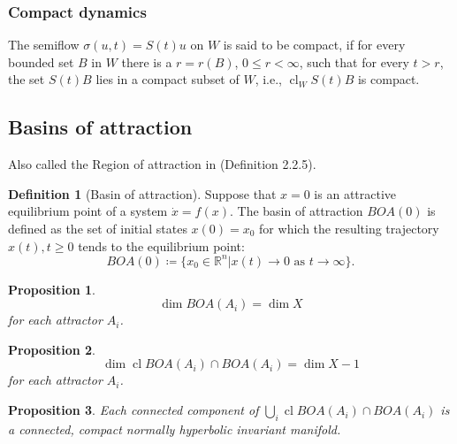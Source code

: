 \documentclass{article}
\newtheorem{proposition}{Proposition}
\theoremstyle{definition} \newtheorem{definition}{Definition}
\theoremstyle{remark} \newtheorem{remark}{Remark}
\newcommand{\reals}{\mathbb{R}}
\newcommand{\cl}{\operatorname{cl}}
\newcounter{ct}
\begin{document}
\subsubsection{Compact dynamics}
The semiflow $\sigma(u, t) = S(t)u$ on $W$ is said to be compact, if for every bounded set $B$ in $W$ there is a $r = r(B)$, $0 \leq r < \infty$, such that for every $t> r$, the set $S(t)B$ lies in a compact subset of $W$, i.e., $\cl_WS(t)B$ is compact. 


\subsection{Basins of attraction}\label{sec:boa}
\citep{milnor1985attractor}
\citep{hirsch1995computing}

Also called the Region of attraction in \citep{garces2012strategies} (Definition 2.2.5).
\begin{definition}[Basin of attraction]
Suppose that $x=0$ is an attractive equilibrium point of a system $\dot x = f(x)$.
The basin of attraction $BOA(0)$ is defined as the set of initial states $x(0)=x_0$ for which the resulting trajectory $x(t), t\geq 0$ tends to the equilibrium point:
\begin{equation}
BOA(0) \coloneqq \{x_0\in \reals^n|x(t)\rightarrow0\text{ as } t\rightarrow\infty\}.
\end{equation}

\end{definition}


\begin{proposition}
\[\dim BOA(A_i) = \dim X\] for each attractor $A_i$.
\end{proposition}
\begin{proposition}
\[\dim\cl BOA(A_i) \cap BOA(A_i) = \dim X - 1 \] for each attractor $A_i$.
\end{proposition}



\begin{proposition}
Each connected component of $\bigcup_i\cl BOA(A_i) \cap BOA(A_i) $ is a connected, compact normally hyperbolic invariant manifold. %
\end{proposition}
\end{document}
